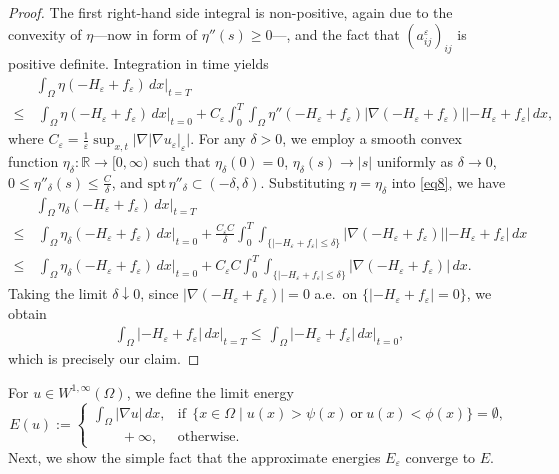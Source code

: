 \documentclass{amsart}
\theoremstyle{definition}
\def\R{{\mathbb{R}}}
\newcommand{\spt}{\mathrm{spt}\,}
\begin{document}
\begin{proof}
The first right-hand side integral is non-positive, again due to the convexity of $\eta$---now in form of $\eta'' (s) \geq 0$---, and the fact that
$(a^\varepsilon _{ij})_{ij}$ is positive definite.
Integration in time yields
\begin{equation}\label{eq8}
\begin{split}
    & \int_{\Omega} \eta (-H_\varepsilon + f_\varepsilon) \, dx\Big|_{t=T} \\
    \leq & \,
    \int_{\Omega} \eta (-H_\varepsilon + f_\varepsilon) \, dx\Big|_{t=0}
    + C_\varepsilon \int _0 ^T \int_{\Omega} 
    \eta'' (-H_\varepsilon + f_\varepsilon) 
    |\nabla (-H_\varepsilon + f_\varepsilon)|
    |-H_\varepsilon + f_\varepsilon| 
    \, dx,
\end{split}
\end{equation}
where 
$
C_\varepsilon =
\frac{1}{\varepsilon} \sup_{x,t} \big| \nabla |\nabla u_\varepsilon|_\varepsilon \big|
$.
For any $\delta>0$, we employ a smooth convex function $\eta_\delta :\R \to [0,\infty)$ such that
$\eta_\delta (0)=0$, $\eta_\delta (s) \to |s|$ 
uniformly as $\delta \to 0$, $0\leq \eta'' _\delta(s) \leq \frac{C}{\delta}$, and
$\spt \eta'' _\delta \subset (-\delta,\delta)$.
Substituting $\eta=\eta_\delta$ into \eqref{eq8},
we have
\begin{equation}
\begin{split}
    &\int_{\Omega} \eta_\delta (-H_\varepsilon + f_\varepsilon) \, dx\Big|_{t=T} \\
    \leq & \, 
    \int_{\Omega} \eta_\delta (-H_\varepsilon + f_\varepsilon) \, dx\Big|_{t=0}
    + \frac{C_\varepsilon C}{\delta} \int _0 ^T \int_{\{ |-H_\varepsilon +f_\varepsilon| \leq \delta \}}  
    |\nabla (-H_\varepsilon + f_\varepsilon)|
    |-H_\varepsilon + f_\varepsilon| 
    \, dx \\
    \leq & \,
    \int_{\Omega} \eta_\delta (-H_\varepsilon + f_\varepsilon) \, dx\Big|_{t=0}
    + C_\varepsilon C
    \int _0 ^T \int_{\{ |-H_\varepsilon +f_\varepsilon| \leq \delta \}}  
    |\nabla (-H_\varepsilon + f_\varepsilon)|
    \, dx.
\end{split}
\end{equation}
Taking the limit $\delta\downarrow0$, since $|\nabla (-H_\varepsilon + f_\varepsilon)| =0$
a.e.\ on $\{ |-H_\varepsilon +f_\varepsilon| =0 \}$, we obtain
\begin{equation}
\begin{split}
    \int_{\Omega} | -H_\varepsilon + f_\varepsilon| \, dx\Big|_{t=T}
    \leq  \, 
    \int_{\Omega} | -H_\varepsilon + f_\varepsilon| \, dx\Big|_{t=0},
\end{split}
\end{equation}
which is precisely our claim.
\end{proof}
For $u \in W ^{1,\infty} (\Omega)$, we define the limit energy
\[
E(u) :=
\begin{cases}
\displaystyle \int_{\Omega} |\nabla u| \, dx, &
\text{if} \ \ \{ x \in \Omega \mid u(x) > \psi (x) \ \text{or} \ u(x) < \phi (x) \} =\emptyset, \\
\qquad +\infty, & \text{otherwise.}    
\end{cases}
\]
Next, we show the simple fact that the approximate energies $E_\varepsilon$ converge to $E$.
\end{document}
